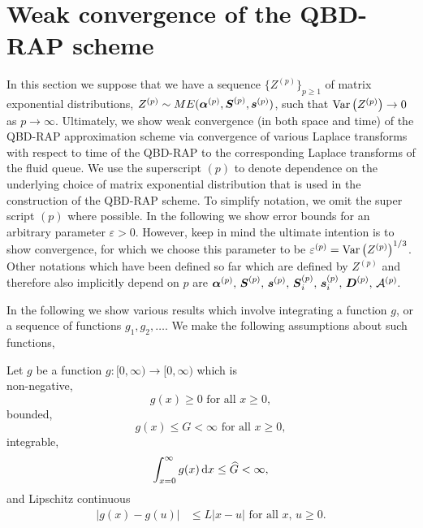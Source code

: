 \chapter{Weak convergence of the QBD-RAP scheme\label{sec: conv}}
In this section we suppose that we have a sequence \(\{Z^{(p)}\}_{p\geq 1}\) of matrix exponential distributions, \(Z^{(p)}\sim ME(\boldsymbol\alpha^{(p)},\boldsymbol S^{(p)}, \boldsymbol s^{(p)})\), such that \(\mathrm{Var}\left(Z^{(p)}\right)\to 0 \) as \(p\to \infty\). Ultimately, we show weak convergence (in both space and time) of the QBD-RAP approximation scheme via convergence of various Laplace transforms with respect to time of the QBD-RAP to the corresponding Laplace transforms of the fluid queue. We use the superscript \((p)\) to denote dependence on the underlying choice of matrix exponential distribution that is used in the construction of the QBD-RAP scheme. To simplify notation, we omit the super script \((p)\) where possible. In the following we show error bounds for an arbitrary parameter \(\varepsilon>0\). However, keep in mind the ultimate intention is to show convergence, for which we choose this parameter to be \(\varepsilon^{(p)}=\mathrm{Var}\left(Z^{(p)}\right)^{1/3}\). Other notations which have been defined so far which are defined by \(Z^{(p)}\) and therefore also implicitly depend on \(p\) are \(\boldsymbol\alpha^{(p)},\,\boldsymbol S^{(p)},\,\boldsymbol s^{(p)},\, \boldsymbol S_i^{(p)},\, \boldsymbol s_i^{(p)},\, \boldsymbol D^{(p)},\,\mathcal A^{(p)}.\)

In the following we show various results which involve integrating a function \(g\), or a sequence of functions \(g_1,g_2,\dots\). We make the following assumptions about such functions, 
\begin{asu}\label{asu: g}
	Let \(g\) be a function \(g:[0,\infty)\to [0,\infty)\) which is \\
	\subasu \label{asu: g non-neg} non-negative, 
	\[g(x) \geq 0 \mbox{ for all } x \geq 0,\]
	\subasu bounded, 
	\[g(x) \leq G < \infty \mbox{ for all } x \geq 0,\]
	\subasu integrable, 
	\[\int_{x=0}^\infty g(x)\, \mathrm{d} x \leq \widehat G < \infty,\]
	\subasu \label{asu: lipschitz} and Lipschitz continuous 
	\begin{align}
		|g(x) - g(u)|&\leq L|x - u| \mbox{ for all } x,\, u \geq 0.
	\end{align}
\end{asu}

